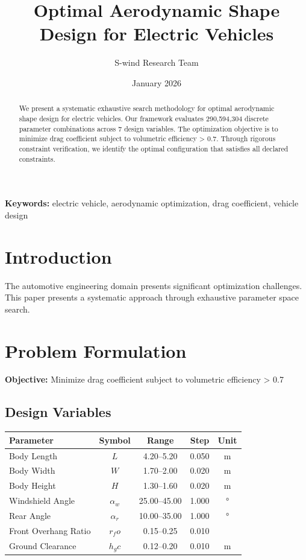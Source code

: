 \documentclass[11pt,a4paper]{article}
\title{Optimal Aerodynamic Shape Design for Electric Vehicles}
\author{S-wind Research Team}
\date{January 2026}
\begin{document}
\maketitle

\begin{abstract}
We present a systematic exhaustive search methodology for optimal aerodynamic shape design for electric vehicles. Our framework evaluates 290,594,304 discrete parameter combinations across 7 design variables. The optimization objective is to minimize drag coefficient subject to volumetric efficiency > 0.7. Through rigorous constraint verification, we identify the optimal configuration that satisfies all declared constraints.
\end{abstract}

\textbf{Keywords:} electric vehicle, aerodynamic optimization, drag coefficient, vehicle design

\section{Introduction}

The automotive engineering domain presents significant optimization challenges. This paper presents a systematic approach through exhaustive parameter space search.

\section{Problem Formulation}

\textbf{Objective:} Minimize drag coefficient subject to volumetric efficiency > 0.7

\subsection{Design Variables}

\begin{center}
\begin{tabular}{|l|c|c|c|c|}
\hline
Parameter & Symbol & Range & Step & Unit \\
\hline
Body Length & $L$ & 4.20--5.20 & 0.050 & m \\
Body Width & $W$ & 1.70--2.00 & 0.020 & m \\
Body Height & $H$ & 1.30--1.60 & 0.020 & m \\
Windshield Angle & $α_w$ & 25.00--45.00 & 1.000 & ° \\
Rear Angle & $α_r$ & 10.00--35.00 & 1.000 & ° \\
Front Overhang Ratio & $r_fo$ & 0.15--0.25 & 0.010 &  \\
Ground Clearance & $h_gc$ & 0.12--0.20 & 0.010 & m \\
\hline
\end{tabular}
\end{center}
\end{document}
